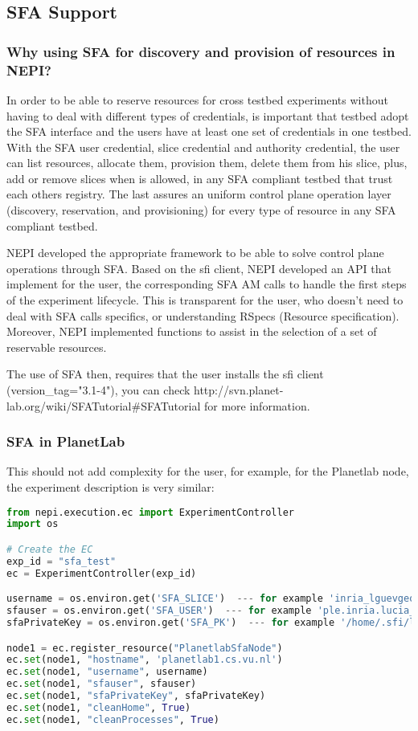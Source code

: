 \subsection{SFA Support}

\subsubsection{Why using SFA for discovery and provision of resources in NEPI?}

In order to be able to reserve resources for cross testbed experiments without having to deal with different types of credentials, is important that testbed adopt the SFA interface and the users have at least one set of credentials in one testbed. With the SFA user credential, slice credential and authority credential, the user can list resources, allocate them, provision them, delete them from his slice, plus, add or remove slices when is allowed, in any SFA compliant testbed that trust each others registry. The last assures an uniform control plane operation layer (discovery, reservation, and provisioning) for every type of resource in any SFA compliant testbed.

NEPI developed the appropriate framework to be able to solve control plane operations through SFA. Based on the sfi client, NEPI developed an API that implement for the user, the corresponding SFA AM calls to handle the first steps of the experiment lifecycle. This is transparent for the user, who doesn't need to deal with SFA calls specifics, or understanding RSpecs (Resource specification). Moreover, NEPI implemented functions to assist in the selection of a set of reservable resources.

The use of SFA then, requires that the user installs the sfi client (version\_tag="3.1-4"), you can check http://svn.planet-lab.org/wiki/SFATutorial\#SFATutorial for more information. 

\subsubsection{SFA in PlanetLab}

This should not add complexity for the user, for example, for the Planetlab node, the experiment description is very similar:
\begin{lstlisting}[language=Python]
from nepi.execution.ec import ExperimentController
import os

# Create the EC
exp_id = "sfa_test"
ec = ExperimentController(exp_id)

username = os.environ.get('SFA_SLICE')  --- for example 'inria_lguevgeo'
sfauser = os.environ.get('SFA_USER')  --- for example 'ple.inria.lucia_guevgeozian_odizzio'
sfaPrivateKey = os.environ.get('SFA_PK')  --- for example '/home/.sfi/lucia_guevgeozian_odizzio.pkey'

node1 = ec.register_resource("PlanetlabSfaNode")
ec.set(node1, "hostname", 'planetlab1.cs.vu.nl')
ec.set(node1, "username", username)
ec.set(node1, "sfauser", sfauser)
ec.set(node1, "sfaPrivateKey", sfaPrivateKey)
ec.set(node1, "cleanHome", True)
ec.set(node1, "cleanProcesses", True)
\end{lstlisting}
